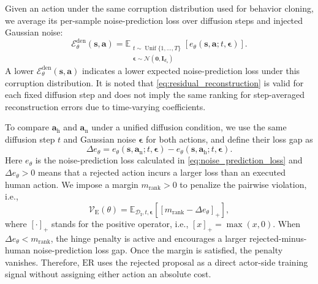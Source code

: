 \documentclass[9pt,journal]{IEEEtran}
\newcommand{\DI}{\mathcal{D}_{\mathrm{I}}}
\newcommand{\E}{\mathbb{E}}
\newcommand{\Eden}{\ensuremath{\mathcal{E}_{\theta}^{\mathrm{den}}}}
\newcommand{\ER}{\ensuremath{\mathrm{ER}}}
\newcommand{\va}{\bm{a}}
\newcommand{\vs}{\bm{s}}
\newcommand{\veps}{\bm{\epsilon}}
\newcommand{\vah}{\ensuremath{\va_{\mathrm h}}}      %
\newcommand{\van}{\ensuremath{\va_{\mathrm n}}}      %
\begin{document}
Given an action under the same corruption
distribution used for behavior cloning, we average its
per-sample noise-prediction loss over diffusion steps
and injected Gaussian noise:
\begin{equation}
    \Eden(\vs,\va)
    =
    \mathbb{E}_{\substack{
        t\sim\operatorname{Unif}\{1,\ldots,T\}\\
        \veps\sim\mathcal{N}(\mathbf{0},\mathbf{I}_{d_{\mathrm a}})
    }}
    \left[
        e_\theta\!\left(\vs,\va;t,\veps\right)
    \right].
    \label{eq:eden}
\end{equation}
A lower $\Eden(\vs,\va)$ indicates a lower expected
noise-prediction loss under this corruption distribution.
It is noted that \eqref{eq:residual_reconstruction} is valid for each fixed
diffusion step and does not imply the same ranking for step-averaged reconstruction errors due to time-varying coefficients.




To compare $\vah$ and $\van$ under a unified diffusion condition, we use the same diffusion step $t$ and Gaussian noise $\veps$ for both actions, and define their loss gap as
\begin{equation*}
    \Delta e_\theta
    =
    e_\theta\!\left(\vs,\van;t,\veps\right)
    -
    e_\theta\!\left(\vs,\vah;t,\veps\right).
\end{equation*}
Here $e_\theta$ is the noise-prediction loss calculated in \eqref{eq:noise_prediction_loss} and $\Delta e_\theta>0$ means that a rejected action incurs a larger loss than an executed human action. We impose a margin $m_{\mathrm{rank}}>0$ to penalize the pairwise violation, i.e.,
\begin{equation}
    \mathcal V_{\mathrm E}(\theta)
    =
    \E_{\DI,t,\veps}
    \left[
    \left[
    m_{\mathrm{rank}}-\Delta e_\theta
    \right]_+
    \right],
    \label{eq:energyrank}
\end{equation}
where $[\cdot]_+$ stands for the positive operator, i.e., $[x]_+=\max(x,0)$.
When $\Delta e_\theta<m_{\mathrm{rank}}$, the hinge penalty is active and encourages a larger
rejected-minus-human noise-prediction loss gap. Once the margin is satisfied, the penalty vanishes.
Therefore, \ER{} uses the rejected proposal as a direct actor-side training signal without assigning either action an absolute cost.
\end{document}
